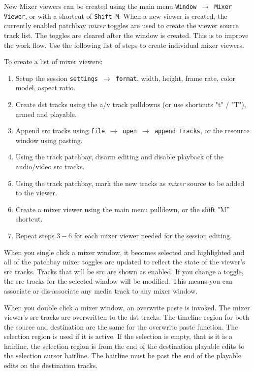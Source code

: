 New Mixer viewers can be created using the main menu \texttt{Window $\rightarrow$ Mixer Viewer}, or with a shortcut of \texttt{Shift-M}.  When a new viewer is created, the currently enabled patchbay \textit{mixer} toggles are used to create the viewer source track list.  The toggles are cleared after the window is created.  This is to improve the work flow.  Use the following list of steps to create individual mixer viewers.

To create a list of mixer viewers:

\begin{enumerate}
	\item Setup the session \texttt{settings $\rightarrow$ format}, width, height, frame rate, color model, aspect ratio.
	\item Create dst tracks using the a/v track pulldowns (or use shortcuts "t" / "T"),  armed and playable.
	\item Append src tracks using \texttt{file $\rightarrow$ open $\rightarrow$ append tracks}, or the resource window using pasting.
	\item Using the track patchbay, disarm editing and disable playback of the audio/video src tracks.
	\item Using the track patchbay, mark the new tracks as \textit{mixer} source to be added to the viewer.
	\item Create a mixer viewer using the main menu pulldown, or the shift "M” shortcut.
	\item Repeat steps $3-6$ for each mixer viewer needed for the session editing.
\end{enumerate}

When you single click a mixer window, it becomes selected and highlighted and all of the patchbay mixer toggles are updated to reflect the state of the viewer’s src tracks.  Tracks that will be src are shown as enabled.  If you change a toggle, the src tracks for the selected window will be modified.  This means you can associate or dis-associate any media track to any mixer window.

When you double click a mixer window, an overwrite paste is invoked.  The mixer viewer’s src tracks are overwritten to the dst tracks.  The timeline region for both the source and destination are the same for the overwrite paste function.  The selection region is used if it is active.  If the selection is empty, that is it is a hairline, the selection region is from the end of the destination playable edits to the selection cursor hairline.  The hairline must be past the end of the playable edits on the destination tracks.

